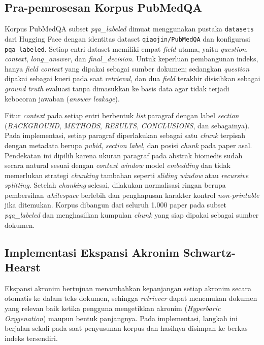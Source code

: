 \subsection{Pra-pemrosesan Korpus PubMedQA}
\label{subsec:impl-praproses-korpus}

Korpus PubMedQA subset \textit{pqa\_labeled} dimuat menggunakan pustaka \texttt{datasets} dari Hugging Face dengan identitas dataset \texttt{qiaojin/PubMedQA} dan konfigurasi \texttt{pqa\_labeled}. Setiap entri dataset memiliki empat \textit{field} utama, yaitu \textit{question}, \textit{context}, \textit{long\_answer}, dan \textit{final\_decision}. Untuk keperluan pembangunan indeks, hanya \textit{field context} yang dipakai sebagai sumber dokumen; sedangkan \textit{question} dipakai sebagai kueri pada saat \textit{retrieval}, dan dua \textit{field} terakhir disisihkan sebagai \textit{ground truth} evaluasi tanpa dimasukkan ke basis data agar tidak terjadi kebocoran jawaban (\textit{answer leakage}).

Fitur \textit{context} pada setiap entri berbentuk \textit{list} paragraf dengan label \textit{section} (\textit{BACKGROUND}, \textit{METHODS}, \textit{RESULTS}, \textit{CONCLUSIONS}, dan sebagainya). Pada implementasi, setiap paragraf diperlakukan sebagai satu \textit{chunk} terpisah dengan metadata berupa \textit{pubid}, \textit{section label}, dan posisi \textit{chunk} pada paper asal. Pendekatan ini dipilih karena ukuran paragraf pada abstrak biomedis sudah secara natural sesuai dengan \textit{context window} model \textit{embedding} dan tidak memerlukan strategi \textit{chunking} tambahan seperti \textit{sliding window} atau \textit{recursive splitting}. Setelah \textit{chunking} selesai, dilakukan normalisasi ringan berupa pembersihan \textit{whitespace} berlebih dan penghapusan karakter kontrol \textit{non-printable} jika ditemukan. Korpus dibangun dari seluruh 1.000 paper pada subset \textit{pqa\_labeled} dan menghasilkan kumpulan \textit{chunk} yang siap dipakai sebagai sumber dokumen.

\subsection{Implementasi Ekspansi Akronim Schwartz-Hearst}
\label{subsec:impl-ekspansi-sh}

Ekspansi akronim bertujuan menambahkan kepanjangan setiap akronim secara otomatis ke dalam teks dokumen, sehingga \textit{retriever} dapat menemukan dokumen yang relevan baik ketika pengguna mengetikkan akronim (\textit{Hyperbaric Oxygenation}) maupun bentuk panjangnya. Pada implementasi, langkah ini berjalan sekali pada saat penyusunan korpus dan hasilnya disimpan ke berkas indeks tersendiri.

